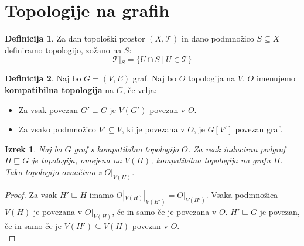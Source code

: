 \documentclass[a4paper, 12pt]{book}
\newtheorem{theorem}{Izrek}[section]
\theoremstyle{definition}
\newtheorem{definition}{Definicija}[section]
\theoremstyle{remark}
\begin{document}
\section{Topologije na grafih}
\begin{definition}
  Za dan topološki prostor $(X, \mathcal{T})$ in dano podmnožico $S \subseteq X$ definiramo
  topologijo, zožano na $S$: \[\mathcal{T}|_S = \{U \cap S\ |\ U \in \mathcal{T}\}\]
\end{definition}
\begin{definition}
  Naj bo $G = (V,E)$ graf. Naj bo $O$ topologija na $V$. $O$ imenujemo \textbf{kompatibilna
  topologija} na $G$, če velja:
  \begin{itemize}
    \item[(1)] Za vsak povezan $G' \sqsubseteq G$ je $V(G')$ povezan v $O$.
    \item[(2)] Za vsako podmnožico $V' \subseteq V$, ki je povezana v $O$, je $G[V']$ povezan graf.
  \end{itemize}
\end{definition}
\begin{theorem}\label{theorem1}
  Naj bo $G$ graf s kompatibilno topologijo $O$. Za vsak induciran podgraf
  $H \sqsubseteq G$ je topologija, omejena na $V(H)$, kompatibilna topologija
  na grafu $H$. Tako topologijo označimo z $O|_{V(H)}$.
\end{theorem}
\begin{proof}
  Za vsak $H' \sqsubseteq H$ imamo $O|_{V(H)}|_{V(H')} = O|_{V(H')}$. 
  Vsaka podmnožica $V(H)$ je povezana v $O|_{V(H)}$, če in samo če je povezana v $O$.
  $H' \sqsubseteq G$ je povezan, če in samo če je $V(H') \subseteq V(H)$ povezan v $O$.\\
\end{proof}
\end{document}
